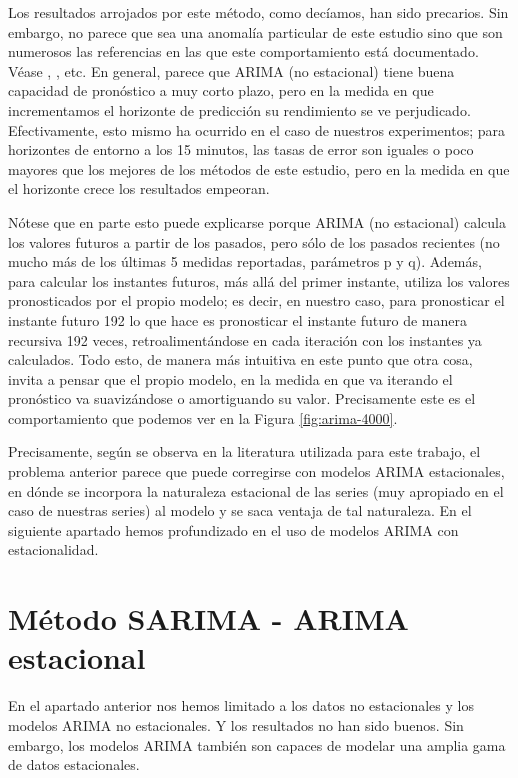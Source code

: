 \documentclass[]{book}
\begin{document}
Los resultados arrojados por este método, como decíamos, han sido
precarios. Sin embargo, no parece que sea una anomalía particular de
este estudio sino que son numerosos las referencias en las que este
comportamiento está documentado. Véase \citep{arima-sarima-lstm-online},
\citep{Forecast6-online}, etc. En general, parece que ARIMA (no
estacional) tiene buena capacidad de pronóstico a muy corto plazo, pero
en la medida en que incrementamos el horizonte de predicción su
rendimiento se ve perjudicado. Efectivamente, esto mismo ha ocurrido en
el caso de nuestros experimentos; para horizontes de entorno a los 15
minutos, las tasas de error son iguales o poco mayores que los mejores
de los métodos de este estudio, pero en la medida en que el horizonte
crece los resultados empeoran.

Nótese que en parte esto puede explicarse porque ARIMA (no estacional)
calcula los valores futuros a partir de los pasados, pero sólo de los
pasados recientes (no mucho más de los últimas 5 medidas reportadas,
parámetros p y q). Además, para calcular los instantes futuros, más allá
del primer instante, utiliza los valores pronosticados por el propio
modelo; es decir, en nuestro caso, para pronosticar el instante futuro
192 lo que hace es pronosticar el instante futuro de manera recursiva
192 veces, retroalimentándose en cada iteración con los instantes ya
calculados. Todo esto, de manera más intuitiva en este punto que otra
cosa, invita a pensar que el propio modelo, en la medida en que va
iterando el pronóstico va suavizándose o amortiguando su valor.
Precisamente este es el comportamiento que podemos ver en la Figura
\ref{fig:arima-4000}.

Precisamente, según se observa en la literatura utilizada para este
trabajo, el problema anterior parece que puede corregirse con modelos
ARIMA estacionales, en dónde se incorpora la naturaleza estacional de
las series (muy apropiado en el caso de nuestras series) al modelo y se
saca ventaja de tal naturaleza. En el siguiente apartado hemos
profundizado en el uso de modelos ARIMA con estacionalidad.

\section{Método SARIMA - ARIMA
estacional}\label{metodo-sarima---arima-estacional}

En el apartado anterior nos hemos limitado a los datos no estacionales y
los modelos ARIMA no estacionales. Y los resultados no han sido buenos.
Sin embargo, los modelos ARIMA también son capaces de modelar una amplia
gama de datos estacionales.
\end{document}
